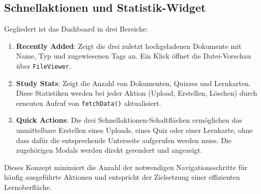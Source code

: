 \subsection{Schnellaktionen und Statistik-Widget}

Gegliedert ist das Dashboard in drei Bereiche:

\begin{enumerate}
    \item \textbf{Recently Added}: Zeigt die drei zuletzt hochgeladenen Dokumente mit Name, Typ und zugewiesenen Tags an. Ein Klick öffnet die Datei-Vorschau über \texttt{FileViewer}.
    \item \textbf{Study Stats}: Zeigt die Anzahl von Dokumenten, Quizzes und Lernkarten. Diese Statistiken werden bei jeder Aktion (Upload, Erstellen, Löschen) durch erneuten Aufruf von \texttt{fetchData()} aktualisiert.
    \item \textbf{Quick Actions}: Die drei Schnellaktionen-Schaltflächen ermöglichen das unmittelbare Erstellen eines Uploads, eines Quiz oder einer Lernkarte, ohne dass dafür die entsprechende Unterseite aufgerufen werden muss. Die zugehörigen Modals werden direkt gerendert und angezeigt.
\end{enumerate}

Dieses Konzept minimiert die Anzahl der notwendigen Navigationsschritte für häufig ausgeführte Aktionen und entspricht der Zielsetzung einer effizienten Lernoberfläche.

